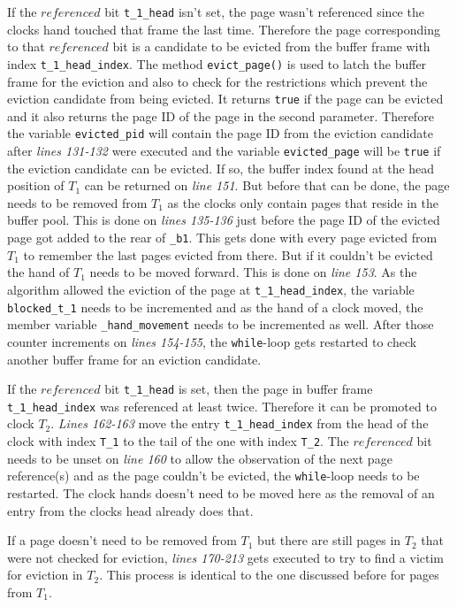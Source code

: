 	If the $referenced$ bit \lstinline{t_1_head} isn't set, the page wasn't referenced since the clocks hand touched that frame the last time. Therefore the page corresponding to that $referenced$ bit is a candidate to be evicted from the buffer frame with index \lstinline{t_1_head_index}. The method \lstinline{evict_page()} is used to latch the buffer frame for the eviction and also to check for the restrictions which prevent the eviction candidate from being evicted. It returns \lstinline{true} if the page can be evicted and it also returns the page ID of the page in the second parameter. Therefore the variable \lstinline{evicted_pid} will contain the page ID from the eviction candidate after \emph{lines 131-132} were executed and the variable \lstinline{evicted_page} will be \lstinline{true} if the eviction candidate can be evicted. If so, the buffer index found at the head position of $T_1$ can be returned on \emph{line 151}. But before that can be done, the page needs to be removed from $T_1$ as the clocks only contain pages that reside in the buffer pool. This is done on \emph{lines 135-136} just before the page ID of the evicted page got added to the rear of \lstinline{_b1}. This gets done with every page evicted from $T_1$ to remember the last pages evicted from there. But if it couldn't be evicted the hand of $T_1$ needs to be moved forward. This is done on \emph{line 153}. As the algorithm allowed the eviction of the page at \lstinline{t_1_head_index}, the variable \lstinline{blocked_t_1} needs to be incremented and as the hand of a clock moved, the member variable \lstinline{_hand_movement} needs to be incremented as well. After those counter increments on \emph{lines 154-155}, the \lstinline{while}-loop gets restarted to check another buffer frame for an eviction candidate.
	
	If the $referenced$ bit \lstinline{t_1_head} is set, then the page in buffer frame \lstinline{t_1_head_index} was referenced at least twice. Therefore it can be promoted to clock $T_2$. \emph{Lines 162-163} move the entry \lstinline{t_1_head_index} from the head of the clock with index \lstinline{T_1} to the tail of the one with index \lstinline{T_2}. The $referenced$ bit needs to be unset on \emph{line 160} to allow the observation of the next page reference(s) and as the page couldn't be evicted, the \lstinline{while}-loop needs to be restarted. The clock hands doesn't need to be moved here as the removal of an entry from the clocks head already does that.
	
	If a page doesn't need to be removed from $T_1$ but there are still pages in $T_2$ that were not checked for eviction, \emph{lines 170-213} gets executed to try to find a victim for eviction in $T_2$. This process is identical to the one discussed before for pages from $T_1$.

